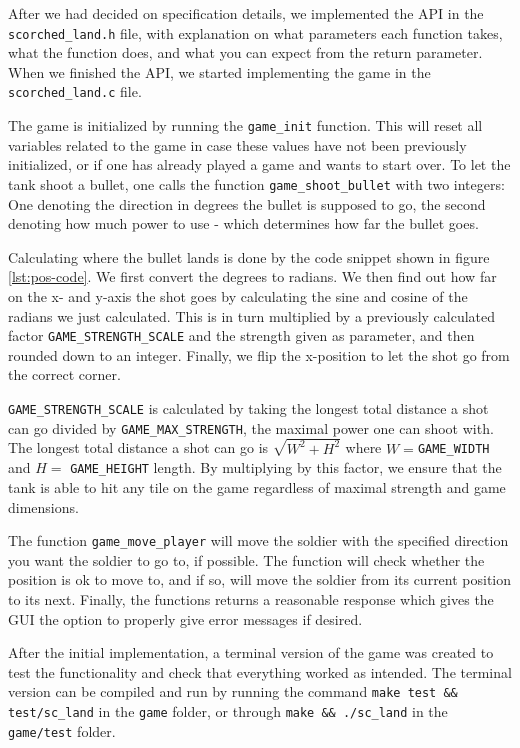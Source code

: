 After we had decided on specification details, we implemented the
API in the \texttt{scorched\_land.h} file, with explanation on what
parameters each function takes, what the function does, and what you can
expect from the return parameter. When we finished the API, we started
implementing the game in the \texttt{scorched\_land.c} file.

The game is initialized by running the \texttt{game\_init} function.
This will reset all variables related to the game in case these values
have not been previously initialized, or if one has already played a
game and wants to start over. To let the tank shoot a bullet, one calls
the function \texttt{game\_shoot\_bullet} with two integers: One
denoting the direction in degrees the bullet is supposed to go, the
second denoting how much power to use - which determines how far the
bullet goes.



Calculating where the bullet lands is done by the code snippet shown in
figure \ref{lst:pos-code}. We first convert the degrees to radians. We
then find out how far on the x- and y-axis the shot goes by calculating
the sine and cosine of the radians we just calculated. This is in turn
multiplied by a previously calculated factor
\texttt{GAME\_STRENGTH\_SCALE} and the strength given as parameter, and
then rounded down to an integer. Finally, we flip the x-position to
let the shot go from the correct corner.

\texttt{GAME\_STRENGTH\_SCALE} is calculated by taking the longest total
distance a shot can go divided by \texttt{GAME\_MAX\_STRENGTH}, the
maximal power one can shoot with.  The longest total distance a shot can
go is $\sqrt{W^2 + H^2}$ where $W = $\texttt{GAME\_WIDTH} and $H =$
\texttt{GAME\_HEIGHT} length.  By multiplying by this factor, we ensure
that the tank is able to hit any tile on the game regardless of maximal
strength and game dimensions. 



The function \texttt{game\_move\_player} will move the soldier with the
specified direction you want the soldier to go to, if possible. The
function will check whether the position is ok to move to, and if so,
will move the soldier from its current position to its next. Finally,
the functions returns a reasonable response which gives the GUI
the option to properly give error messages if desired.

After the initial implementation, a terminal version of the game was
created to test the functionality and check that everything worked as intended.
The terminal version can be compiled and run by running the command 
\verb|make test && test/sc_land| in the \texttt{game} folder, or
through \verb|make && ./sc_land| in the \texttt{game/test} folder.

